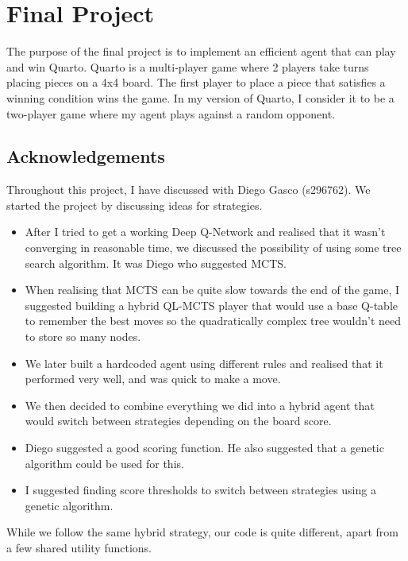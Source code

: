 
\section{Final Project}

The purpose of the final project is to implement an efficient agent that can play and win Quarto. Quarto is a multi-player game where 2 players take turns placing pieces on a 4x4 board. The first player to place a piece that satisfies a winning condition wins the game. In my version of Quarto, I consider it to be a two-player game where my agent plays against a random opponent.

\subsection{Acknowledgements}

Throughout this project, I have discussed with Diego Gasco (s296762). We started the project by discussing ideas for strategies.

\begin{itemize}
    \item After I tried to get a working Deep Q-Network and realised that it wasn't converging in reasonable time, we discussed the possibility of using some tree search algorithm. It was Diego who suggested MCTS.
    \item When realising that MCTS can be quite slow towards the end of the game, I suggested building a hybrid QL-MCTS player that would use a base Q-table to remember the best moves so the quadratically complex tree wouldn't need to store so many nodes.
    \item We later built a hardcoded agent using different rules and realised that it performed very well, and was quick to make a move.
    \item We then decided to combine everything we did into a hybrid agent that would switch between strategies depending on the board score.
    \item Diego suggested a good scoring function. He also suggested that a genetic algorithm could be used for this.
    \item I suggested finding score thresholds to switch between strategies using a genetic algorithm.
\end{itemize}

While we follow the same hybrid strategy, our code is quite different, apart from a few shared utility functions.

